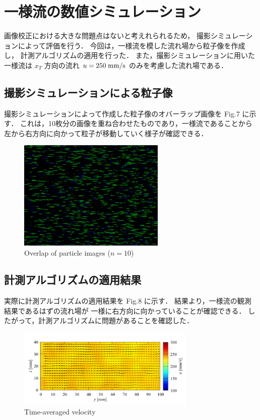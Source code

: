 \documentclass[twocolumn,a4j]{jsarticle}
\begin{document}
\section{一様流の数値シミュレーション}
画像校正における大きな問題点はないと考えれられるため，
撮影シミュレーションによって評価を行う．
今回は，一様流を模した流れ場から粒子像を作成し，
計測アルゴリズムの適用を行った．
また，撮影シミュレーションに用いた一様流は
$x_T$ 方向の流れ $u = 250\;\rm{mm/s}$ のみを考慮した流れ場である．
 \baselineskip

\subsection{撮影シミュレーションによる粒子像}
撮影シミュレーションによって作成した粒子像のオバーラップ画像を Fig.7 に示す．
これは，10枚分の画像を重ね合わせたものであり，一様流であることから
左から右方向に向かって粒子が移動していく様子が確認できる．

\begin{figure}[htbp]
  \centering
  \includegraphics[keepaspectratio, width=70mm]{../images/UniformFlow/UniformFlow_by_Simulation.bmp}
  \caption{Overlap of particle images ($n = 10$)}
\end{figure}

\subsection{計測アルゴリズムの適用結果}
実際に計測アルゴリズムの適用結果を Fig.8 に示す．
結果より，一様流の観測結果であるはずの流れ場が
一様に右方向に向かっていることが確認できる．
したがって，計測アルゴリズムに問題があることを確認した．

\begin{figure}[htbp]
  \centering
  \includegraphics[keepaspectratio, width=85mm]{../images/UniformFlow/velocity_xyz.png}
  \caption{Time-averaged velocity}
\end{figure}
\end{document}
